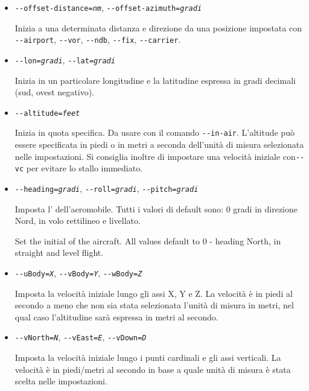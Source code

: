 {\begin{itemize}
  \item{\texttt{-$ $-offset-distance={\it nm}}, \texttt{-$ $-offset-azimuth={\it gradi}}}

  Inizia a una determinata distanza e direzione da una posizione impostata con \texttt{-$ $-airport},
  \texttt{-$ $-vor}, \texttt{-$ $-ndb}, \texttt{-$ $-fix}, \texttt{-$ $-carrier}.

  \item{\texttt{-$ $-lon={\it gradi}}, \texttt{-$ $-lat={\it gradi}}}

  Inizia in un particolare longitudine e la latitudine espressa in gradi decimali (sud, ovest negativo).

  \item{\texttt{-$ $-altitude={\it feet}}}

  Inizia in quota specifica. Da usare con il comando \texttt{-$ $-in-air}.
  L'altitude pu\`{o} essere specificata in piedi o in metri a seconda
  dell'unit\`{a} di misura selezionata nelle impostazioni. Si consiglia
  inoltre di impostare una velocit\`{a} iniziale con\texttt{-$ $-vc} per evitare lo stallo immediato.

  \item{\texttt{-$ $-heading={\it gradi}}, \texttt{-$ $-roll={\it gradi}}, \texttt{-$ $-pitch={\it gradi}}}

  Imposta l' dell'aeromobile. Tutti i valori di default sono:
  0 gradi in direzione Nord, in volo rettilineo e livellato.

  Set the initial  of the aircraft. All values default to 0 - heading North, in straight and level flight.

  \item{\texttt{-$ $-uBody={\it X}}, \texttt{-$ $-vBody={\it Y}}, \texttt{-$ $-wBody={\it Z}}}

  Imposta la velocit\`{a} iniziale lungo gli assi X, Y e Z. La velocit\`{a} \`{e} in piedi al secondo a meno che non
  sia stata selezionata l'unit\`{a} di misura in metri, nel qual caso l'altitudine sar\`{a} espressa in metri al secondo.

  \item{\texttt{-$ $-vNorth={\it N}}, \texttt{-$ $-vEast={\it E}}, \texttt{-$ $-vDown={\it D}}}

  Imposta la velocit\`{a} iniziale lungo i punti cardinali e gli assi verticali.
  La velocit\`{a} \`{e} in piedi/metri al secondo in base a quale unit\`{a} di misura \`{e} stata scelta nelle impostazioni.


\end{itemize}}

